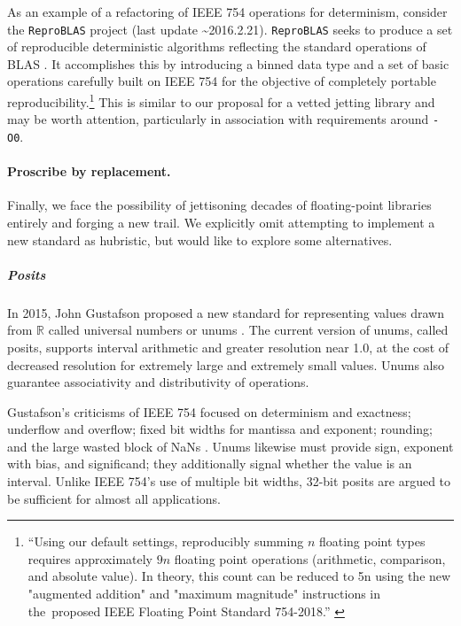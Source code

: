 \documentclass[twoside]{article}
\begin{document}
As an example of a refactoring of IEEE 754 operations for determinism, consider the \texttt{ReproBLAS} project (last update \textasciitilde 2016.2.21).   \texttt{ReproBLAS} seeks to produce a set of reproducible deterministic algorithms reflecting the standard operations of BLAS \citep{ReproBLAS}.  It accomplishes this by introducing a binned data type and a set of basic operations carefully built on IEEE 754 for the objective of completely portable reproducibility.\footnote{“Using our default settings, reproducibly summing $n$ floating point types requires approximately $9n$ floating point operations (arithmetic, comparison, and absolute value). In theory, this count can be reduced to 5n using the new "augmented addition" and "maximum magnitude" instructions in the proposed IEEE Floating Point Standard 754-2018.”  \citep{ReproBLAS}}  This is similar to our proposal for a vetted jetting library and may be worth attention, particularly in association with requirements around \texttt{-O0}.

\paragraph{Proscribe by replacement.}

Finally, we face the possibility of jettisoning decades of floating-point libraries entirely and forging a new trail.  We explicitly omit attempting to implement a new standard as hubristic, but would like to explore some alternatives.

\subparagraph{Posits}

In 2015, John Gustafson proposed a new standard for representing values drawn from $\mathbb{R}$ called universal numbers or unums \citep{Gustafson2015, Gustafson2017, Gustafson2017a, Posit2022}.  The current version of unums, called posits, supports interval arithmetic and greater resolution near 1.0, at the cost of decreased resolution for extremely large and extremely small values.  Unums also guarantee associativity and distributivity of operations.

Gustafson's criticisms of IEEE 754 focused on determinism and exactness; underflow and overflow; fixed bit widths for mantissa and exponent; rounding; and the large wasted block of NaNs \citep{Risse2016}.  Unums likewise must provide sign, exponent with bias, and significand; they additionally signal whether the value is an interval.  Unlike IEEE 754's use of multiple bit widths, 32-bit posits are argued to be sufficient for almost all applications.
\end{document}
